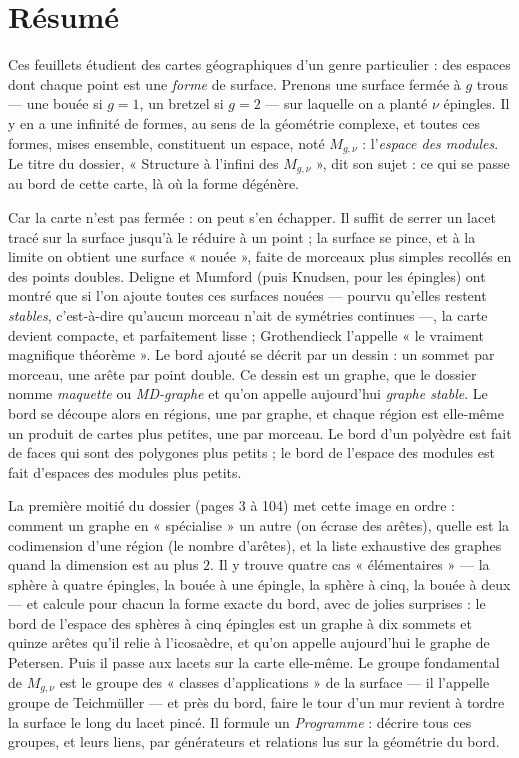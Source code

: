 \documentclass[11pt,a4paper]{article}
\begin{document}
\section*{Résumé}

\begin{resume}
Ces feuillets étudient des cartes géographiques d'un genre particulier : des
espaces dont chaque point est une \emph{forme} de surface. Prenons une surface
fermée à $g$ trous — une bouée si $g = 1$, un bretzel si $g = 2$ — sur laquelle
on a planté $\nu$ épingles. Il y en a une infinité de formes, au sens de la
géométrie complexe, et toutes ces formes, mises ensemble, constituent un espace,
noté $M_{g,\nu}$ : l'\emph{espace des modules}. Le titre du dossier, « Structure
à l'infini des $M_{g,\nu}$ », dit son sujet : ce qui se passe au bord de cette
carte, là où la forme dégénère.

Car la carte n'est pas fermée : on peut s'en échapper. Il suffit de serrer un
lacet tracé sur la surface jusqu'à le réduire à un point ; la surface se
pince, et à la limite on obtient une surface « nouée », faite de morceaux plus
simples recollés en des points doubles. Deligne et Mumford (puis Knudsen, pour les
épingles) ont montré que si l'on ajoute toutes ces surfaces nouées — pourvu qu'elles restent \emph{stables},
c'est-à-dire qu'aucun morceau n'ait de symétries continues —, la carte devient
compacte, et parfaitement lisse ; Grothendieck l'appelle « le vraiment
magnifique théorème ». Le bord ajouté se décrit par un dessin : un sommet par
morceau, une arête par point double. Ce dessin est un graphe, que le dossier
nomme \emph{maquette} ou \emph{MD-graphe} et qu'on appelle aujourd'hui
\emph{graphe stable}. Le bord se découpe alors en régions, une par graphe, et
chaque région est elle-même un produit de cartes plus petites, une par
morceau. Le bord d'un polyèdre est fait de faces qui sont des polygones plus
petits ; le bord de l'espace des modules est fait d'espaces des modules plus
petits.

La première moitié du dossier (pages 3 à 104) met cette image en ordre :
comment un graphe en « spécialise » un autre (on écrase des arêtes), quelle est
la codimension d'une région (le nombre d'arêtes), et la liste exhaustive des
graphes quand la dimension est au plus $2$. Il y trouve quatre cas
« élémentaires » — la sphère à quatre épingles, la bouée à une épingle, la
sphère à cinq, la bouée à deux — et calcule pour chacun la forme exacte du bord,
avec de jolies surprises : le bord de l'espace des sphères à cinq épingles est
un graphe à dix sommets et quinze arêtes qu'il relie à l'icosaèdre, et qu'on
appelle aujourd'hui le graphe de Petersen. Puis il passe aux lacets sur la
carte elle-même. Le groupe fondamental de $M_{g,\nu}$ est le groupe des
« classes d'applications » de la surface — il l'appelle groupe de Teichmüller —
et près du bord, faire le tour d'un mur revient à tordre la surface le long du
lacet pincé. Il formule un \emph{Programme} : décrire tous ces groupes, et leurs
liens, par générateurs et relations lus sur la géométrie du bord.


\end{resume}
\end{document}
